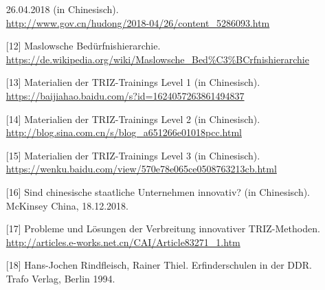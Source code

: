 \documentclass[11pt,a4paper]{article}
\begin{document}
\begin{itemize}
  26.04.2018 (in Chinesisch). \\
  \url{http://www.gov.cn/hudong/2018-04/26/content_5286093.htm}
\item[{[12]}] Maslowsche Bedürfnishierarchie.\\
  \url{https://de.wikipedia.org/wiki/Maslowsche_Bed%C3%BCrfnishierarchie}
\item[{[13]}] Materialien der TRIZ-Trainings Level 1 (in Chinesisch).\\
  \url{https://baijiahao.baidu.com/s?id=1624057263861494837}
\item[{[14]}] Materialien der TRIZ-Trainings Level 2 (in Chinesisch).\\
  \url{http://blog.sina.com.cn/s/blog_a651266e01018pcc.html}
\item[{[15]}] Materialien der TRIZ-Trainings Level 3 (in Chinesisch).\\
  \url{https://wenku.baidu.com/view/570e78e065ce0508763213cb.html}
\item[{[16]}] Sind chinesische staatliche Unternehmen innovativ? (in
  Chinesisch).  McKinsey China, 18.12.2018.
\item[{[17]}] Probleme und Lösungen der Verbreitung innovativer
  TRIZ-Methoden.\\ 
  \url{http://articles.e-works.net.cn/CAI/Article83271_1.htm}
\item[{[18]}] Hans-Jochen Rindfleisch, Rainer Thiel. Erfinderschulen in der
  DDR.  Trafo Verlag, Berlin 1994.
\end{itemize}
\end{document}
